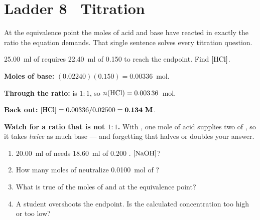 \documentclass{apchem-worksheet}
\begin{document}
\section*{\sffamily Ladder 8 \textbullet\ Titration}

At the equivalence point the moles of acid and base have reacted in
exactly the ratio the equation demands. That single sentence solves every
titration question.

\begin{workedexample}
\SI{25.00}{\milli\litre} of  requires \SI{22.40}{\milli\litre} of
\SI{0.150}{\Molar}  to reach the endpoint. Find $[\ce{HCl}]$.

\textbf{Moles of base:} $(0.02240)(0.150) = \num{0.00336}$~mol.

\textbf{Through the ratio:}  is $1:1$, so
$n(\ce{HCl}) = \num{0.00336}$~mol.

\textbf{Back out:} $[\ce{HCl}] = 0.00336/0.02500 = \mathbf{0.134~M}$.

\textbf{Watch for a ratio that is not $1:1$.} With , one mole of
acid supplies two of , so it takes \emph{twice} as much base ---
and forgetting that halves or doubles your answer.
\end{workedexample}

\begin{yourturn}
\begin{enumerate}[leftmargin=*,itemsep=0.5em]
  \item \SI{20.00}{\milli\litre} of  needs
        \SI{18.60}{\milli\litre} of \SI{0.200}{\Molar} .
        $[\ce{NaOH}]$? \workspace[1.8cm]
  \item How many moles of  neutralize \SI{0.0100}{\mole} of
        ? \workspace[1.4cm]
  \item What is true of the moles of  and  at the
        equivalence point? \workspace[1.6cm]
  \item A student overshoots the endpoint. Is the calculated concentration
        too high or too low? \workspace[1.6cm]
\end{enumerate}
\end{yourturn}
\end{document}
